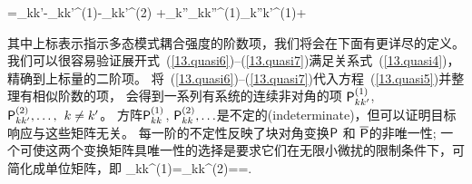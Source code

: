 {{{{=\ssI_{kk'}-\ssP_{kk'}^{(1)}-\ssP_{kk'}^{(2)}
+\half\sum_{k''}\ssP_{kk''}^{(1)}\ssP_{k''k'}^{(1)}+\cdots
\en

其中上标表示指示多态模式耦合强度的阶数项，我们将会在下面有更详尽的定义。
我们可以很容易验证展开式~(\ref{13.quasi6})--(\ref{13.quasi7})满足关系式~(\ref{13.quasi4})，
精确到上标量的二阶项。
将~(\ref{13.quasi6})--(\ref{13.quasi7})代入方程~(\ref{13.quasi5})并整理有相似阶数的项，
会得到一系列有系统的连续非对角的项
$\ssP_{kk'}^{\raisebox{-0.7 ex}{\scriptsize (1)}}$,
$\ssP_{kk'}^{\raisebox{-0.7 ex}{\scriptsize (2)}},
\ldots,\hspace{1.5 mm} k\neq k'$。
方阵$\ssP_{kk}^{\raisebox{-0.7 ex}
{\scriptsize (1)}}$, $\ssP_{kk}^{\raisebox{-0.7 ex}{\scriptsize (2)}},
\ldots$是不定的(indeterminate)，但可以证明目标响应与这些矩阵无关。
每一阶的不定性反映了块对角变换$\mbox{${\sf P}$}$ 和 $\overline{\mbox{${\sf P}$}}$的非唯一性;
一个可使这两个变换矩阵具唯一性的选择是要求它们在无限小微扰的限制条件下，可简化成单位矩阵，即
\eq \label{13.quasi8}
\ssP_{kk}^{(1)}=\ssP_{kk}^{(2)}=\cdots=\sszero.
\en
}}}}
